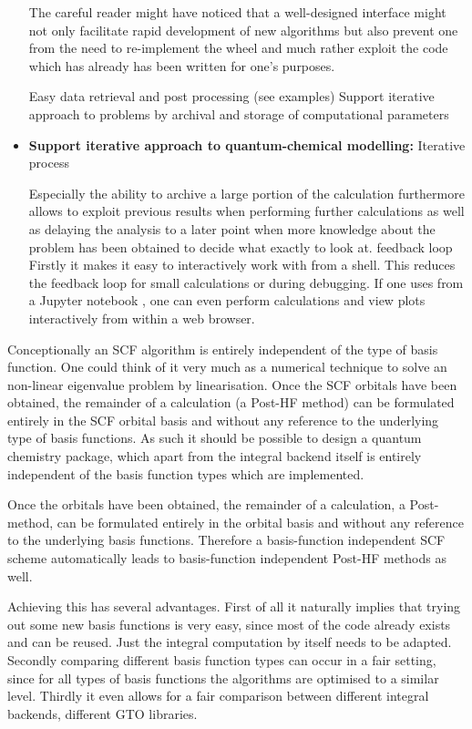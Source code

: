 \begin{itemize}
The careful reader might have noticed that a well-designed interface
might not only facilitate rapid development of new algorithms
but also prevent one from the need to re-implement the wheel
and much rather exploit the code which has already has been written
for one's purposes.

Easy data retrieval and post processing (see examples)
Support iterative approach to problems by archival
and storage of computational parameters
%
%
\item \textbf{Support iterative approach to quantum-chemical modelling:}
Iterative process

Especially the ability to archive a large portion of the calculation
furthermore allows to exploit previous results when performing
further calculations as well as delaying the analysis
to a later point when \eg more knowledge about the
problem has been obtained to decide what exactly to look at.
%
feedback loop
Firstly it makes it easy to interactively work with \molsturm
from a shell. This reduces the feedback loop for small calculations
or during debugging.  If one uses \molsturm from a Jupyter notebook \cite{Jupyter},
one can even perform calculations and view plots interactively from within a web browser.
\end{itemize}



Conceptionally an SCF algorithm is entirely independent of the type of basis function.
One could think of it very much as a numerical technique to solve
an non-linear eigenvalue problem by linearisation.
Once the SCF orbitals have been obtained,
the remainder of a calculation (\eg a Post-HF method)
can be formulated entirely in the SCF orbital basis
and without any reference to the underlying type of basis functions.
As such it should be possible to design a quantum chemistry package,
which apart from the integral backend itself is entirely independent
of the basis function types which are implemented.

Once the \SCF orbitals have been obtained,
the remainder of a calculation, \eg a Post-\HF method,
can be formulated entirely in the \SCF orbital basis
and without any reference to the underlying basis functions.
Therefore a basis-function independent SCF scheme automatically
leads to basis-function independent Post-HF methods as well.

Achieving this has several advantages.
First of all it naturally implies that trying out some new basis functions is very easy,
since most of the code already exists and can be reused.
Just the integral computation by itself needs to be adapted.
Secondly comparing different basis function types can occur in a fair setting,
since for all types of basis functions the algorithms are optimised to a similar level.
Thirdly it even allows for a fair comparison between different integral backends,
\eg different GTO libraries.

